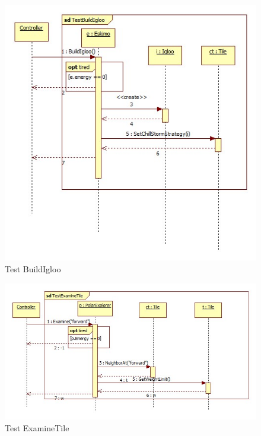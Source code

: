 \begin{figure}[H]
	\begin{center}
		\includegraphics[width=15cm]{chapters/chapter05/diagrams/Test_BuildIgloo.jpg}
		\caption{Test BuildIgloo}
		\label{fig:Test BuildIgloo}
	\end{center}
\end{figure}

\begin{figure}[H]
	\begin{center}
		\includegraphics[width=17cm]{chapters/chapter05/diagrams/Test_ExamineTile.jpg}
		\caption{Test ExamineTile}
		\label{fig:Test ExamineTile}
	\end{center}
\end{figure}

